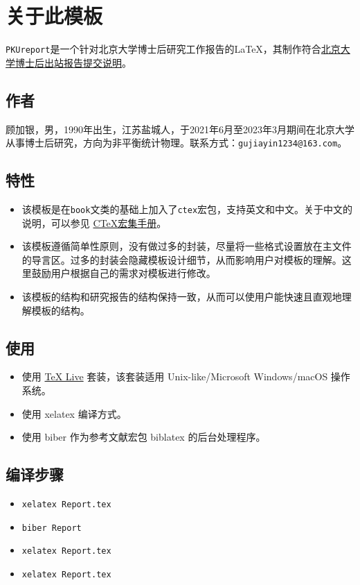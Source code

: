 \chapter{关于此模板}




\texttt{PKUreport}是一个针对北京大学博士后研究工作报告的{\LaTeX}，其制作符合\href{https://www.lib.pku.edu.cn/portal/cn/zy/dzzy/chuzhanbaogao/tijiaoyaoqiu}{北京大学博士后出站报告提交说明}。



\section*{作者}
顾加银，男，1990年出生，江苏盐城人，于2021年6月至2023年3月期间在北京大学从事博士后研究，方向为非平衡统计物理。联系方式：\texttt{gujiayin1234@163.com}。


\section*{特性}
\begin{itemize}
\item 该模板是在\texttt{book}文类的基础上加入了\texttt{ctex}宏包，支持英文和中文。关于中文的说明，可以参见 \href{https://ctan.org/pkg/ctex?lang=en}{CTeX宏集手册}。
\item 该模板遵循简单性原则，没有做过多的封装，尽量将一些格式设置放在主文件的导言区。过多的封装会隐藏模板设计细节，从而影响用户对模板的理解。这里鼓励用户根据自己的需求对模板进行修改。
\item 该模板的结构和研究报告的结构保持一致，从而可以使用户能快速且直观地理解模板的结构。
\end{itemize}



\section*{使用}
\begin{itemize}
\item 使用 \href{http://tug.org/texlive/}{TeX Live} 套装，该套装适用 Unix-like/Microsoft Windows/macOS 操作系统。
\item 使用 xelatex 编译方式。
\item 使用 biber 作为参考文献宏包 biblatex 的后台处理程序。
\end{itemize}




\section*{编译步骤}
\begin{itemize}
\item \texttt{xelatex Report.tex}
\item \texttt{biber Report}
\item \texttt{xelatex Report.tex}
\item \texttt{xelatex Report.tex}
\end{itemize}




